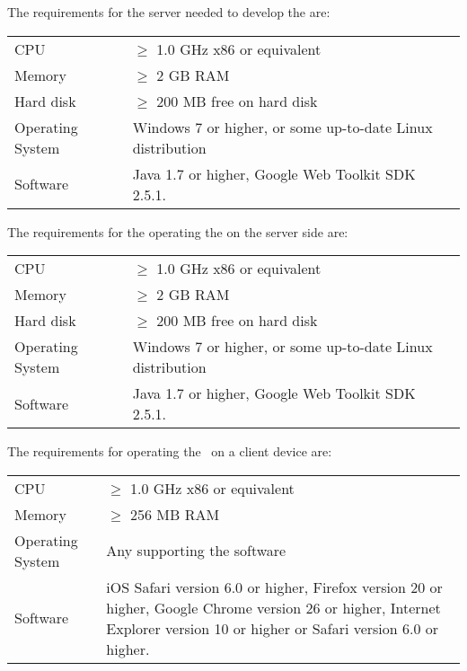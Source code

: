 \fpstartparagraph{} The requirements for the server needed to develop the \applicationname{} are:

\begin{center}
\begin{tabular}{p{} p{}}
CPU & $\geq$ 1.0 GHz x86 or equivalent \\
Memory & $\geq$ 2 GB RAM \\
Hard disk & $\geq$ 200 MB free on hard disk \\
Operating System & Windows 7 or higher, or some up-to-date Linux distribution\\
Software & Java 1.7 or higher, Google Web Toolkit SDK 2.5.1.\\
\end{tabular}
\end{center}

\fpstartparagraph{} The requirements for the operating the \applicationname{} on the server side are:

\begin{center}
\begin{tabular}{p{} p{}}
CPU & $\geq$ 1.0 GHz x86 or equivalent \\
Memory & $\geq$ 2 GB RAM \\
Hard disk & $\geq$ 200 MB free on hard disk \\
Operating System & Windows 7 or higher, or some up-to-date Linux distribution\\
Software & Java 1.7 or higher, Google Web Toolkit SDK 2.5.1.\\
\end{tabular}
\end{center}

\begin{samepage}
\fpstartparagraph{} The requirements for operating the \applicationname\ on a client device are:

\begin{center}
\begin{tabular}{p{} p{}}
CPU & $\geq$ 1.0 GHz x86 or equivalent \\
Memory & $\geq$ 256 MB RAM \\
Operating System & Any supporting the software\\
Software & iOS Safari version 6.0 or higher, Firefox version 20 or higher, Google Chrome version 26 or higher, Internet Explorer version 10 or higher or Safari version 6.0 or higher.\\
\end{tabular}
\end{center}
\end{samepage}